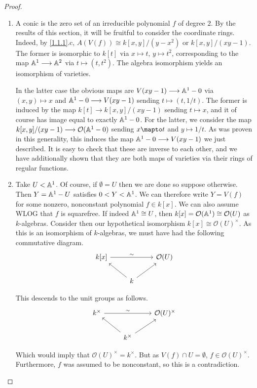 \begin{proof}
    \begin{enumerate}[label = (\alph*)]
        \item A conic is the zero set of an irreducible polynomial $f$ of degree $2$. By the results of this section, it will be fruitful to consider the coordinate rings. Indeed, by \ref{1.1.1}.c, $A(V(f)) \cong k[x, y]/(y - x^2)$ or $k[x, y]/(xy - 1)$. The former is isomorphic to $k[t]$ via $x \mapsto t$, $y \mapsto t^2$, corresponding to the map $\mathbb A^1 \longrightarrow \mathbb A^2$ via $t \mapsto (t, t^2)$. The algebra isomorphism yields an isomorphism of varieties.

        In the latter case the obvious maps are $V(xy - 1) \longrightarrow \mathbb A^1 - 0$ via $(x, y) \mapsto x$ and $\mathbb A^1 - 0 \longrightarrow V(xy - 1)$ sending $t \mapsto (t, 1/t)$. The former is induced by the map $k[t] \longrightarrow k[x, y]/(xy - 1)$ sending $t \mapsto x$, and it of course has image equal to exactly $\mathbb A^1 - 0$. For the latter, we consider the map $k[x, y]/(xy - 1) \longrightarrow \mathcal O(\mathbb A^1 - 0)$ sending $x \mapto t$ and $y \mapsto 1/t$. As \cite[I.3.5]{hartshorne} was proven in this generality, this induces the map $\mathbb A^1 - 0 \longrightarrow V(xy - 1)$ we just described. It is easy to check that these are inverse to each other, and we have additionally shown that they are both maps of varieties via their rings of regular functions.

        \item Take $U < \mathbb A^1$. Of course, if $\emptyset = U$ then we are done so suppose otherwise. Then $Y = \mathbb A^1 - U$ satisfies $0 < Y < \mathbb A^1$. We can therefore write $Y = V(f)$ for some nonzero, nonconstant polynomial $f \in k[x]$. We can also assume WLOG that $f$ is squarefree. If indeed $\mathbb A^1 \cong U$, then $k[x] = \mathcal O(\mathbb A^1) \cong \mathcal O(U)$ as $k$-algebras. Consider then our hypothetical isomorphism $k[x] \cong \mathcal O(U)^\times$. As this is an isomorphism of $k$-algebras, we must have had the following commutative diagram.
        $$
        \begin{tikzcd}
            k[x] \arrow[rr, "\sim"] && \mathcal O(U)\\
            & k \arrow[ur] \arrow[ul]
        \end{tikzcd}
        $$

        This descends to the unit groups as follows.
        $$
        \begin{tikzcd}
            k^\times \arrow[rr, "\sim"] && \mathcal O(U)^\times\\
            & k^\times \arrow[ur] \arrow[ul]
        \end{tikzcd}
        $$

        Which would imply that $\mathcal O(U)^\times = k^\times$. But as $V(f) \cap U = \emptyset$, $f \in \mathcal O(U)^\times$. Furthermore, $f$ was assumed to be nonconstant, so this is a contradiction.
    \end{enumerate}
\end{proof}
